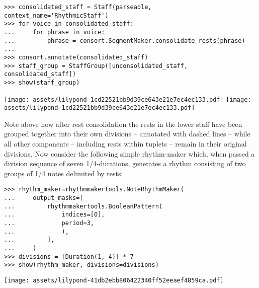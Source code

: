 \begin{abjadbookoutput}
\begin{singlespacing}
\vspace{-0.5\baselineskip}
\begin{verbatim}
>>> consolidated_staff = Staff(parseable, context_name='RhythmicStaff')
>>> for voice in consolidated_staff:
...     for phrase in voice:
...         phrase = consort.SegmentMaker.consolidate_rests(phrase)
...
>>> consort.annotate(consolidated_staff)
>>> staff_group = StaffGroup([unconsolidated_staff, consolidated_staff])
>>> show(staff_group)
\end{verbatim}
\noindent\texttt{[image: assets/lilypond-1cd22521bb9d39ce643e21e7ec4ec133.pdf]}
\newline
\newline
\noindent\texttt{[image: assets/lilypond-1cd22521bb9d39ce643e21e7ec4ec133.pdf]}
\end{singlespacing}
\end{abjadbookoutput}

\noindent Note above how after rest consolidation the rests in the lower staff have been grouped
together into their own divisions -- annotated with dashed lines -- while all
other components -- including rests within tuplets -- remain in their original
divisions. Now consider the following simple rhythm-maker which, when passed a
division sequence of seven 1/4-durations, generates a rhythm consisting
of two groups of 1/4 notes delimited by rests:

\begin{comment}
<abjad>
rhythm_maker=rhythmmakertools.NoteRhythmMaker(
    output_masks=[
        rhythmmakertools.BooleanPattern(
            indices=[0],
            period=3,
            ),
        ],
    )
divisions = [Duration(1, 4)] * 7
show(rhythm_maker, divisions=divisions)
</abjad>
\end{comment}

\begin{abjadbookoutput}
\begin{singlespacing}
\vspace{-0.5\baselineskip}
\begin{verbatim}
>>> rhythm_maker=rhythmmakertools.NoteRhythmMaker(
...     output_masks=[
...         rhythmmakertools.BooleanPattern(
...             indices=[0],
...             period=3,
...             ),
...         ],
...     )
>>> divisions = [Duration(1, 4)] * 7
>>> show(rhythm_maker, divisions=divisions)
\end{verbatim}
\noindent\texttt{[image: assets/lilypond-41db2ebb806422340ff52eeaef4859ca.pdf]}
\end{singlespacing}
\end{abjadbookoutput}

